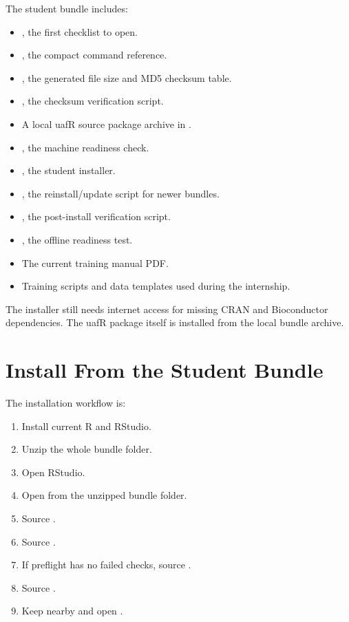 The student bundle includes:
\begin{itemize}
  \item {}, the first checklist to open.
  \item {}, the compact command reference.
  \item {}, the generated file size and MD5 checksum table.
  \item {}, the checksum verification script.
  \item A local uafR source package archive in .
  \item {}, the machine readiness check.
  \item {}, the student installer.
  \item {}, the reinstall/update script for newer bundles.
  \item {}, the post-install verification script.
  \item {}, the offline readiness test.
  \item The current training manual PDF.
  \item Training scripts and data templates used during the internship.
\end{itemize}

The installer still needs internet access for missing CRAN and Bioconductor dependencies. The uafR package itself is installed from the local bundle archive.

\section{Install From the Student Bundle}
The installation workflow is:

\begin{enumerate}
  \item Install current R and RStudio.
  \item Unzip the whole bundle folder.
  \item Open RStudio.
  \item Open  from the unzipped bundle folder.
  \item Source .
  \item Source .
  \item If preflight has no failed checks, source .
  \item Source .
  \item Keep  nearby and open .
\end{enumerate}

